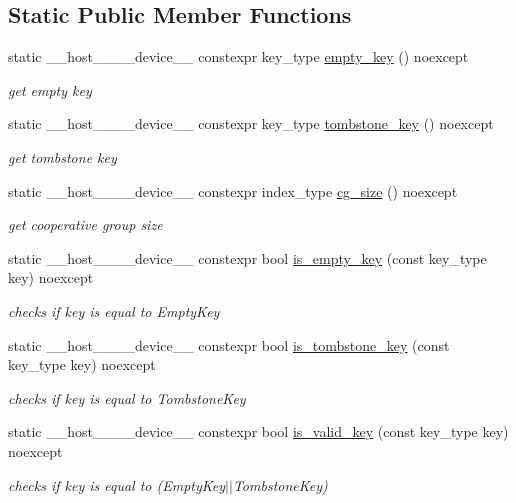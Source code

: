 \subsection*{Static Public Member Functions}
\begin{DoxyCompactItemize}
\item 
static \+\_\+\+\_\+host\+\_\+\+\_\+\+\_\+\+\_\+device\+\_\+\+\_\+ constexpr key\+\_\+type \hyperlink{classwarpcore_1_1MultiValueHashTable_a86fffd9e87b2880ccba285614a6238f3}{empty\+\_\+key} () noexcept
\begin{DoxyCompactList}\small\item\em get empty key \end{DoxyCompactList}\item 
static \+\_\+\+\_\+host\+\_\+\+\_\+\+\_\+\+\_\+device\+\_\+\+\_\+ constexpr key\+\_\+type \hyperlink{classwarpcore_1_1MultiValueHashTable_a9eec07133f3b950b5c6465e4b8b53e78}{tombstone\+\_\+key} () noexcept
\begin{DoxyCompactList}\small\item\em get tombstone key \end{DoxyCompactList}\item 
static \+\_\+\+\_\+host\+\_\+\+\_\+\+\_\+\+\_\+device\+\_\+\+\_\+ constexpr index\+\_\+type \hyperlink{classwarpcore_1_1MultiValueHashTable_ad300c5a01bd933343ff08176fb4b4e29}{cg\+\_\+size} () noexcept
\begin{DoxyCompactList}\small\item\em get cooperative group size \end{DoxyCompactList}\item 
static \+\_\+\+\_\+host\+\_\+\+\_\+\+\_\+\+\_\+device\+\_\+\+\_\+ constexpr bool \hyperlink{classwarpcore_1_1MultiValueHashTable_a23d1ba2d5e85a2465685f353ee5d0872}{is\+\_\+empty\+\_\+key} (const key\+\_\+type key) noexcept
\begin{DoxyCompactList}\small\item\em checks if {\ttfamily key} is equal to {\ttfamily Empty\+Key} \end{DoxyCompactList}\item 
static \+\_\+\+\_\+host\+\_\+\+\_\+\+\_\+\+\_\+device\+\_\+\+\_\+ constexpr bool \hyperlink{classwarpcore_1_1MultiValueHashTable_a76fed9a05c9111488189e1b22c435f63}{is\+\_\+tombstone\+\_\+key} (const key\+\_\+type key) noexcept
\begin{DoxyCompactList}\small\item\em checks if {\ttfamily key} is equal to {\ttfamily Tombstone\+Key} \end{DoxyCompactList}\item 
static \+\_\+\+\_\+host\+\_\+\+\_\+\+\_\+\+\_\+device\+\_\+\+\_\+ constexpr bool \hyperlink{classwarpcore_1_1MultiValueHashTable_a130e94f97c0002895317f086442e8470}{is\+\_\+valid\+\_\+key} (const key\+\_\+type key) noexcept
\begin{DoxyCompactList}\small\item\em checks if {\ttfamily key} is equal to {\ttfamily }(Empty\+Key$\vert$$\vert$\+Tombstone\+Key) \end{DoxyCompactList}\end{DoxyCompactItemize}


